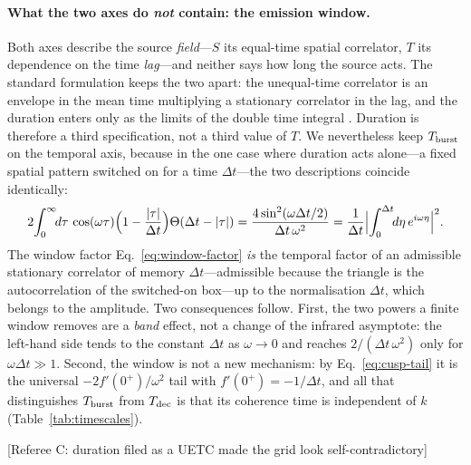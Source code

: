 \documentclass[10pt,prd,aps,nobibnotes,superscriptaddress,preprintnumbers,notitlepage]{revtex4-1}
\newcommand{\add}[1]{{\color{red}#1}}
\newcommand{\why}[1]{{\color{red}\footnotesize\textsf{[#1]}}}
\newcommand{\add}[1]{#1}
\newcommand{\why}[1]{}
\begin{document}
\add{\paragraph{What the two axes do \emph{not} contain: the emission window.}
Both axes describe the source \emph{field}---$S$ its equal-time spatial correlator,
$T$ its dependence on the time \emph{lag}---and neither says how long the source acts.
The standard formulation keeps the two apart: the unequal-time correlator is an
envelope in the mean time multiplying a stationary correlator in the lag, and the
duration enters only as the limits of the double time integral
\cite{Caprini:2009fx,RoperPol:2022iel,RoperPol:2023dzg,Stomberg:2025kxf}. Duration is
therefore a third specification, not a third value of $T$.
We nevertheless keep $T_{\rm burst}$ on the temporal axis, because in the one case
where duration acts alone---a fixed spatial pattern switched on for a time $\Delta
t$---the two descriptions coincide identically:
\begin{equation}
  2\!\int_{0}^{\infty}\!\!d\tau\,\cos(\omega\tau)
  \Bigl(1-\frac{|\tau|}{\Delta t}\Bigr)\Theta(\Delta t-|\tau|)
  =\frac{4\sin^{2}(\omega\Delta t/2)}{\Delta t\,\omega^{2}}
  =\frac{1}{\Delta t}\Bigl|\int_{0}^{\Delta t}\!\!d\eta\,e^{i\omega\eta}\Bigr|^{2}.
  \label{eq:burst-equals-triangle}
\end{equation}
The window factor Eq.~\eqref{eq:window-factor} \emph{is} the temporal factor of an
admissible stationary correlator of memory $\Delta t$---admissible because the triangle
is the autocorrelation of the switched-on box---up to the normalisation $\Delta t$,
which belongs to the amplitude. Two consequences follow. First, the two powers a finite
window removes are a \emph{band} effect, not a change of the infrared asymptote: the
left-hand side tends to the constant $\Delta t$ as $\omega\to0$ and reaches
$2/(\Delta t\,\omega^{2})$ only for $\omega\Delta t\gg1$. Second, the window is not a new
mechanism: by Eq.~\eqref{eq:cusp-tail} it is the universal $-2f'(0^{+})/\omega^{2}$ tail
with $f'(0^{+})=-1/\Delta t$, and all that distinguishes $T_{\rm burst}$ from
$T_{\rm dec}$ is that its coherence time is independent of $k$
(Table~\ref{tab:timescales}).}
\why{Referee C: duration filed as a UETC made the grid look self-contradictory}
\end{document}
